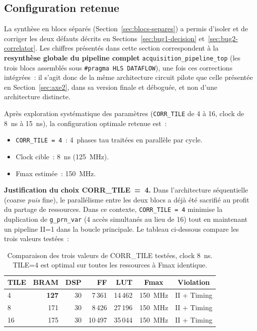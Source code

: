 \documentclass[11pt,a4paper]{article}
\begin{document}
\subsection{Configuration retenue}

La synthèse en blocs séparés (Section~\ref{sec:blocs-separes}) a permis d'isoler et de corriger les deux défauts décrits en Sections~\ref{sec:bug1-decision} et~\ref{sec:bug2-correlator}. Les chiffres présentés dans cette section correspondent à la \textbf{resynthèse globale du pipeline complet} \texttt{acquisition\_pipeline\_top} (les trois blocs assemblés sous \texttt{\#pragma HLS DATAFLOW}), une fois ces corrections intégrées~: il s'agit donc de la même architecture circuit pilote que celle présentée en Section~\ref{sec:axe2}, dans sa version finale et déboguée, et non d'une architecture distincte.

Après exploration systématique des paramètres (\texttt{CORR\_TILE} de 4 à 16, clock de 8~ns à 15~ns), la configuration optimale retenue est~:

\begin{itemize}
  \item \texttt{CORR\_TILE = 4}~: 4~phases tau traitées en parallèle par cycle.
  \item Clock cible~: 8~ns (125~MHz).
  \item Fmax estimée~: 150~MHz.
\end{itemize}

\textbf{Justification du choix CORR\_TILE~=~4.} Dans l'architecture séquentielle (coarse \textit{puis} fine), le parallélisme entre les deux blocs a déjà été sacrifié au profit du partage de ressources. Dans ce contexte, \texttt{CORR\_TILE~=~4} minimise la duplication de \texttt{g\_prn\_var} (4 accès simultanés au lieu de 16) tout en maintenant un pipeline II=1 dans la boucle principale. Le tableau ci-dessous compare les trois valeurs testées~:

\begin{table}[H]
\centering
\renewcommand{\arraystretch}{1.3}
\begin{tabular}{lrrrrcc}
\toprule
\textbf{TILE} & \textbf{BRAM} & \textbf{DSP} & \textbf{FF} & \textbf{LUT} & \textbf{Fmax} & \textbf{Violation} \\
\midrule
4  & \textbf{127} & 30 & 7\,361  & 14\,462 & 150~MHz & II + Timing \\
8  & 171          & 30 & 8\,426  & 27\,196 & 150~MHz & II + Timing \\
16 & 175          & 30 & 10\,497 & 35\,044 & 150~MHz & II + Timing \\
\bottomrule
\end{tabular}
\caption{Comparaison des trois valeurs de CORR\_TILE testées, clock 8~ns. TILE=4 est optimal sur toutes les ressources à Fmax identique.}
\end{table}
\end{document}

